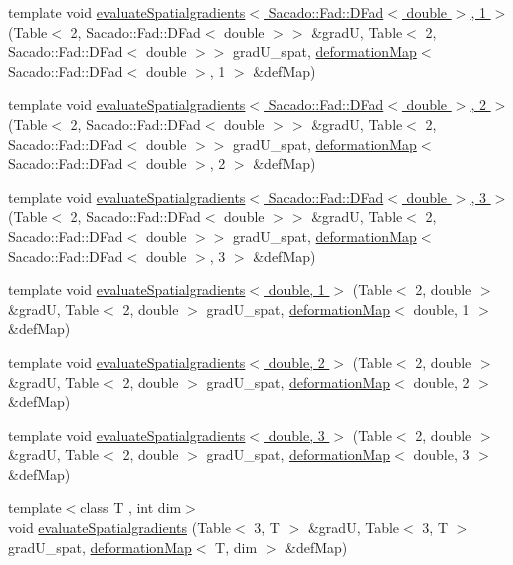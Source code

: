 \begin{DoxyCompactItemize}
\item 
template void \hyperlink{function_evaluations_8cc_a63fd1422475c69c324aefec06a9b4fa0}{evaluate\-Spatialgradients$<$ Sacado\-::\-Fad\-::\-D\-Fad$<$ double $>$, 1 $>$} (Table$<$ 2, Sacado\-::\-Fad\-::\-D\-Fad$<$ double $>$$>$ \&grad\-U, Table$<$ 2, Sacado\-::\-Fad\-::\-D\-Fad$<$ double $>$$>$ grad\-U\-\_\-spat, \hyperlink{structdeformation_map}{deformation\-Map}$<$ Sacado\-::\-Fad\-::\-D\-Fad$<$ double $>$, 1 $>$ \&def\-Map)
\item 
template void \hyperlink{function_evaluations_8cc_a574a864ff662620c8b632523d5a2fe61}{evaluate\-Spatialgradients$<$ Sacado\-::\-Fad\-::\-D\-Fad$<$ double $>$, 2 $>$} (Table$<$ 2, Sacado\-::\-Fad\-::\-D\-Fad$<$ double $>$$>$ \&grad\-U, Table$<$ 2, Sacado\-::\-Fad\-::\-D\-Fad$<$ double $>$$>$ grad\-U\-\_\-spat, \hyperlink{structdeformation_map}{deformation\-Map}$<$ Sacado\-::\-Fad\-::\-D\-Fad$<$ double $>$, 2 $>$ \&def\-Map)
\item 
template void \hyperlink{function_evaluations_8cc_adc3a2ad656bc48d7a11c24f546ba43bd}{evaluate\-Spatialgradients$<$ Sacado\-::\-Fad\-::\-D\-Fad$<$ double $>$, 3 $>$} (Table$<$ 2, Sacado\-::\-Fad\-::\-D\-Fad$<$ double $>$$>$ \&grad\-U, Table$<$ 2, Sacado\-::\-Fad\-::\-D\-Fad$<$ double $>$$>$ grad\-U\-\_\-spat, \hyperlink{structdeformation_map}{deformation\-Map}$<$ Sacado\-::\-Fad\-::\-D\-Fad$<$ double $>$, 3 $>$ \&def\-Map)
\item 
template void \hyperlink{function_evaluations_8cc_a629c7bb265581b5853dbfb9af43c4a0a}{evaluate\-Spatialgradients$<$ double, 1 $>$} (Table$<$ 2, double $>$ \&grad\-U, Table$<$ 2, double $>$ grad\-U\-\_\-spat, \hyperlink{structdeformation_map}{deformation\-Map}$<$ double, 1 $>$ \&def\-Map)
\item 
template void \hyperlink{function_evaluations_8cc_a8f2e81f6aec814594a6ce54d2a8634f4}{evaluate\-Spatialgradients$<$ double, 2 $>$} (Table$<$ 2, double $>$ \&grad\-U, Table$<$ 2, double $>$ grad\-U\-\_\-spat, \hyperlink{structdeformation_map}{deformation\-Map}$<$ double, 2 $>$ \&def\-Map)
\item 
template void \hyperlink{function_evaluations_8cc_ac4df16de901d5280657a240a274e62a2}{evaluate\-Spatialgradients$<$ double, 3 $>$} (Table$<$ 2, double $>$ \&grad\-U, Table$<$ 2, double $>$ grad\-U\-\_\-spat, \hyperlink{structdeformation_map}{deformation\-Map}$<$ double, 3 $>$ \&def\-Map)
\item 
{\footnotesize template$<$class T , int dim$>$ }\\void \hyperlink{group___evaluation_functions_ga0b976342d491f6215953e2e65ea6a0de}{evaluate\-Spatialgradients} (Table$<$ 3, T $>$ \&grad\-U, Table$<$ 3, T $>$ grad\-U\-\_\-spat, \hyperlink{structdeformation_map}{deformation\-Map}$<$ T, dim $>$ \&def\-Map)

\end{DoxyCompactItemize}
